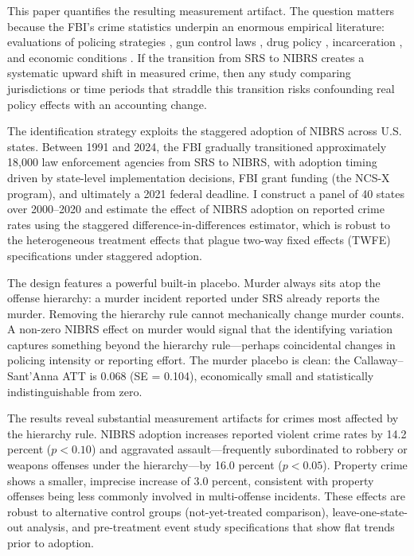 \documentclass[12pt]{article}
\begin{document}
This paper quantifies the resulting measurement artifact. The question matters because the FBI's crime statistics underpin an enormous empirical literature: evaluations of policing strategies \citep{weisburd2016police}, gun control laws \citep{donohue2019right}, drug policy \citep{miron2004drug}, incarceration \citep{liedka2006crime}, and economic conditions \citep{raphael2001identifying}. If the transition from SRS to NIBRS creates a systematic upward shift in measured crime, then any study comparing jurisdictions or time periods that straddle this transition risks confounding real policy effects with an accounting change.

The identification strategy exploits the staggered adoption of NIBRS across U.S. states. Between 1991 and 2024, the FBI gradually transitioned approximately 18,000 law enforcement agencies from SRS to NIBRS, with adoption timing driven by state-level implementation decisions, FBI grant funding (the NCS-X program), and ultimately a 2021 federal deadline. I construct a panel of 40 states over 2000--2020 and estimate the effect of NIBRS adoption on reported crime rates using the \citet{callaway2021difference} staggered difference-in-differences estimator, which is robust to the heterogeneous treatment effects that plague two-way fixed effects (TWFE) specifications under staggered adoption.

The design features a powerful built-in placebo. Murder always sits atop the offense hierarchy: a murder incident reported under SRS already reports the murder. Removing the hierarchy rule cannot mechanically change murder counts. A non-zero NIBRS effect on murder would signal that the identifying variation captures something beyond the hierarchy rule---perhaps coincidental changes in policing intensity or reporting effort. The murder placebo is clean: the Callaway--Sant'Anna ATT is 0.068 (SE = 0.104), economically small and statistically indistinguishable from zero.

The results reveal substantial measurement artifacts for crimes most affected by the hierarchy rule. NIBRS adoption increases reported violent crime rates by 14.2 percent ($p < 0.10$) and aggravated assault---frequently subordinated to robbery or weapons offenses under the hierarchy---by 16.0 percent ($p < 0.05$). Property crime shows a smaller, imprecise increase of 3.0 percent, consistent with property offenses being less commonly involved in multi-offense incidents. These effects are robust to alternative control groups (not-yet-treated comparison), leave-one-state-out analysis, and pre-treatment event study specifications that show flat trends prior to adoption.
\end{document}
